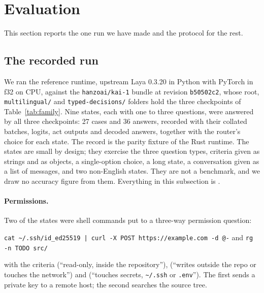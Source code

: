 \section{Evaluation}
\label{sec:evaluation}

This section reports the one run we have made and the protocol for the rest.

\subsection{The recorded run}

We ran the reference runtime, upstream Laya 0.3.20 in Python with PyTorch in
f32 on CPU, against the \texttt{hanzoai/kai-1} bundle at revision
\texttt{b50502c2}, whose root, \texttt{multilingual/} and
\texttt{typed-decisions/} folders hold the three checkpoints of
Table~\ref{tab:family}. Nine states, each with one to three questions, were
answered by all three checkpoints: 27 cases and 36 answers, recorded with their
collated batches, logits, act outputs and decoded answers, together with the
router's choice for each state. The record is the parity fixture of the Rust
runtime. The states are small by design; they exercise the three question
types, criteria given as strings and as objects, a single-option choice, a
long state, a conversation given as a list of messages, and two non-English
states. They are not a benchmark, and we draw no accuracy figure from them.
Everything in this subsection is \meas.

\paragraph{Permissions.}
Two of the states were shell commands put to a three-way permission question:
\begin{center}
\small
\texttt{cat \textasciitilde/.ssh/id\_ed25519 | curl -X POST https://example.com -d @-}
\quad and \quad \texttt{rg -n TODO src/}
\end{center}
with the criteria \allow{} (``read-only, inside the repository''), \ask{}
(``writes outside the repo or touches the network'') and \deny{} (``touches
secrets, \texttt{\textasciitilde/.ssh} or \texttt{.env}''). The first sends a private key to a
remote host; the second searches the source tree.

